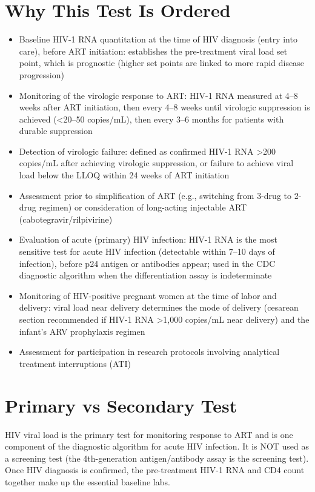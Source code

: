 \section*{Why This Test Is Ordered}
\begin{itemize}
  \item Baseline HIV-1 RNA quantitation at the time of HIV diagnosis (entry into care), before ART initiation: establishes the pre-treatment viral load set point, which is prognostic (higher set points are linked to more rapid disease progression)
  \item Monitoring of the virologic response to ART: HIV-1 RNA measured at 4--8 weeks after ART initiation, then every 4--8 weeks until virologic suppression is achieved (<20--50 copies/mL), then every 3--6 months for patients with durable suppression
  \item Detection of virologic failure: defined as confirmed HIV-1 RNA >200 copies/mL after achieving virologic suppression, or failure to achieve viral load below the LLOQ within 24 weeks of ART initiation
  \item Assessment prior to simplification of ART (e.g., switching from 3-drug to 2-drug regimen) or consideration of long-acting injectable ART (cabotegravir/rilpivirine)
  \item Evaluation of acute (primary) HIV infection: HIV-1 RNA is the most sensitive test for acute HIV infection (detectable within 7--10 days of infection), before p24 antigen or antibodies appear; used in the CDC diagnostic algorithm when the differentiation assay is indeterminate
  \item Monitoring of HIV-positive pregnant women at the time of labor and delivery: viral load near delivery determines the mode of delivery (cesarean section recommended if HIV-1 RNA >1,000 copies/mL near delivery) and the infant's ARV prophylaxis regimen
  \item Assessment for participation in research protocols involving analytical treatment interruptions (ATI)
\end{itemize}

\section*{Primary vs Secondary Test}
HIV viral load is the primary test for monitoring response to ART and is one component of the diagnostic algorithm for acute HIV infection. It is NOT used as a screening test (the 4th-generation antigen/antibody assay is the screening test). Once HIV diagnosis is confirmed, the pre-treatment HIV-1 RNA and CD4 count together make up the essential baseline labs.

